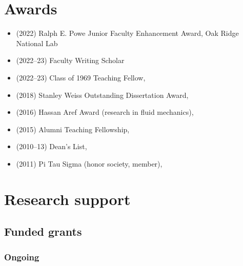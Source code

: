 \section{Awards}

\begin{itemize}
    \item (2022) Ralph E. Powe Junior Faculty Enhancement Award, Oak Ridge National Lab
    \item (2022--23) \GT Faculty Writing Scholar
    \item (2022--23) Class of 1969 Teaching Fellow, \GIT
    \item (2018) Stanley Weiss Outstanding Dissertation Award, \UIUC
    \item (2016) Hassan Aref Award (research in fluid mechanics), \UIUC
    \item (2015) Alumni Teaching Fellowship, \UIUC
    \item (2010--13) Dean's List, \UMD
    \item (2011) Pi Tau Sigma (honor society, member), \UMD
\end{itemize}

\section{Research support}



\subsection{Funded grants}

\subsubsection{Ongoing}

